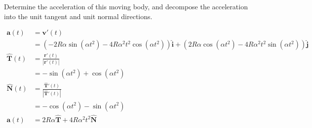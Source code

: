 Determine the acceleration of this moving body, and decompose the acceleration into the unit tangent and unit normal directions.

\begin{solution}
\begin{align*}
    \boldsymbol{a}(t) &= \boldsymbol{v}'(t) \\
    &= \left(-2R \alpha \sin \left( \alpha t^2 \right) - 4R \alpha^2t^2\cos\left(\alpha t^2\right) \right)\hat{\boldsymbol{i}} + \left(2R \alpha \cos \left( \alpha t^2 \right) - 4R \alpha^2t^2\sin\left(\alpha t^2\right) \right)\hat{\boldsymbol{j}} \\
    \boldsymbol{\hat{T}}(t) &= \frac{\boldsymbol{r}'(t)}{|\boldsymbol{r}'(t)|} \\
    &= -\sin\left(\alpha t^2\right) + \cos\left(\alpha t^2\right) \\
    \boldsymbol{\hat{N}}(t) &= \frac{\boldsymbol{\hat{T}}'(t)}{|\boldsymbol{\hat{T}}'(t)|} \\
    &= -\cos\left(\alpha t^2\right) - \sin\left(\alpha t^2\right) \\
    \boldsymbol{a}(t) &= 2R\alpha \boldsymbol{\hat{T}} + 4R\alpha^2t^2 \boldsymbol{\hat{N}}
\end{align*}
\end{solution}